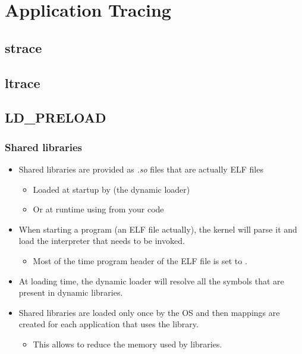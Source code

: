 \section{Application Tracing}

\subsection{strace}



\subsection{ltrace}



\subsection{LD\_PRELOAD}

\begin{frame}
  \frametitle{Shared libraries}
  \begin{itemize}
    \item Shared libraries are provided as {\em .so} files that are actually ELF files
    \begin{itemize}
      \item Loaded at startup by  (the dynamic loader)
      \item Or at runtime using  from your code
    \end{itemize}
    \item When starting a program (an ELF file actually), the kernel will
          parse it and load the interpreter that needs to be invoked.
    \begin{itemize}
      \item Most of the time  program header of the ELF file is
            set to .
    \end{itemize}
    \item At loading time, the dynamic loader  will resolve all the
          symbols that are present in dynamic libraries.
    \item Shared libraries are loaded only once by the OS and then mappings are
          created for each application that uses the library.
    \begin{itemize}
      \item This allows to reduce the memory used by libraries.
    \end{itemize}
  \end{itemize}
\end{frame}

